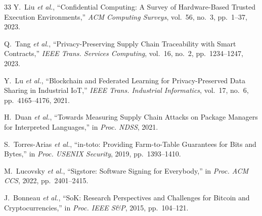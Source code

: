 \documentclass[conference]{IEEEtran}
\begin{document}
\begin{thebibliography}{33}
Y.~Liu {\em et al.}, ``Confidential Computing: A Survey of Hardware-Based
Trusted Execution Environments,'' \textit{ACM Computing Surveys}, vol.~56,
no.~3, pp.~1--37, 2023.

Q.~Tang {\em et al.}, ``Privacy-Preserving Supply Chain Traceability with
Smart Contracts,'' \textit{IEEE Trans. Services Computing}, vol.~16, no.~2,
pp.~1234--1247, 2023.

Y.~Lu {\em et al.}, ``Blockchain and Federated Learning for Privacy-Preserved
Data Sharing in Industrial IoT,'' \textit{IEEE Trans. Industrial Informatics},
vol.~17, no.~6, pp.~4165--4176, 2021.

H.~Duan {\em et al.}, ``Towards Measuring Supply Chain Attacks on Package
Managers for Interpreted Languages,'' in \textit{Proc. NDSS}, 2021.

S.~Torres-Arias {\em et al.}, ``in-toto: Providing Farm-to-Table Guarantees
for Bits and Bytes,'' in \textit{Proc. USENIX Security}, 2019, pp.~1393--1410.

M.~Lucovsky {\em et al.}, ``Sigstore: Software Signing for Everybody,'' in
\textit{Proc. ACM CCS}, 2022, pp.~2401--2415.

J.~Bonneau {\em et al.}, ``SoK: Research Perspectives and Challenges for Bitcoin
and Cryptocurrencies,'' in \textit{Proc. IEEE S\&P}, 2015, pp.~104--121.

\end{thebibliography}

\end{document}
